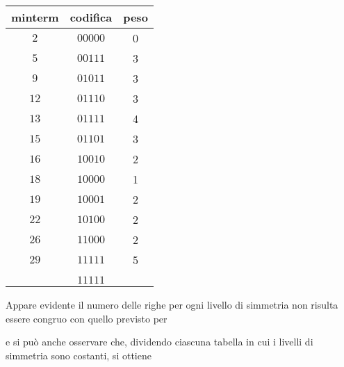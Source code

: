 \documentclass[a4paper]{extarticle}
\renewcommand\arraystretch{}
\begin{document}
\begin{itemize}
    \noindent
    \begin{table}[H]
    \setlength{\tabcolsep}{4pt}
    \renewcommand{\arraystretch}{1.2}
    \centering
    \begin{tabular}{|c|c|c|}
        minterm & codifica & peso\\
        \hline
        $2$ & $00000$ & 0\\
        $5$ & $00111$ & 3\\
        $9$ & $01011$ & 3\\
        $12$ & $01110$ & 3\\
        $13$ & $01111$ & 4\\
        $15$ & $01101$ & 3\\
        $16$ & $10010$ & 2\\
        $18$ & $10000$ & 1\\
        $19$ & $10001$ & 2\\
        $22$ & $10100$ & 2\\
        $26$ & $11000$ & 2\\
        $29$ & $11111$ & 5\\
        \hline
         & & \\
         & $11111$ & \\
    \end{tabular}
    \end{table}

    \vspace{1em}
    \noindent
    Appare evidente il numero delle righe per ogni livello di simmetria non risulta essere congruo con quello previsto per 

    
    
    e si può anche osservare che, dividendo ciascuna tabella in cui i livelli di simmetria sono costanti, si ottiene
    

\end{itemize}
\end{document}
